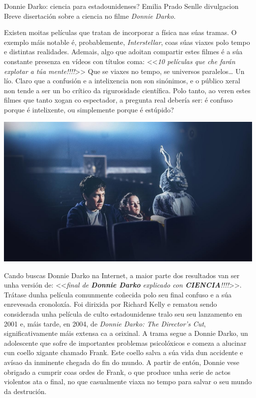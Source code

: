 \Titular%
{Donnie Darko: ciencia para estadounidenses?}%
{Emilia Prado Senlle}%
{divulgacion}%
{Breve disertación sobre a ciencia no filme \textit{Donnie Darko}.}%

\begin{refsection}
\begin{multicols}{2}


Existen moitas películas que tratan de incorporar a física nas súas tramas. O
exemplo máis notable é, probablemente, \textit{Interstellar}, coas súas viaxes
polo tempo e distintas realidades. Ademais, algo que adoitan compartir estes
filmes é a súa constante presenza en vídeos con títulos coma: <<\textit{10
películas que che farán explotar a túa mente!!!!}>> Que se viaxes no tempo, se
universos paralelos… Un lío. Claro que a confusión e a intelixencia non son
sinónimos, e o público xeral non tende a ser un bo crítico da rigurosidade
científica. Polo tanto, ao veren estes filmes que tanto xogan co espectador, a
pregunta real debería ser: é confuso porque é intelixente, ou simplemente
porque é estúpido?\\

\begin{centering}
    \includegraphics[width=1\linewidth]{revistas/002/imaxes/DONNIE-DARKO.jpg}
\end{centering}

Cando buscas Donnie Darko na Internet, a maior parte dos resultados van ser
unha versión de: <<\textit{final de \textbf{Donnie Darko} explicado con
\textbf{CIENCIA}!!!!}>>. Trátase dunha película comunmente coñecida polo seu
final confuso e a súa enrevesada cronoloxía. Foi dirixida por Richard Kelly e
rematou sendo considerada unha película de culto estadounidense tralo seu seu
lanzamento en 2001 e, máis tarde, en 2004, de \textit{Donnie Darko: The
Director’s Cut}, significativamente máis extensa ca a orixinal. A trama segue a
Donnie Darko, un adolescente que sofre de importantes problemas psicolóxicos e
comeza a alucinar cun coello xigante chamado Frank. Este coello salva a súa
vida dun accidente e avísao da inminente chegada do fin do mundo. A partir de
entón, Donnie vese obrigado a cumprir coas ordes de Frank, o que produce unha
serie de actos violentos ata o final, no que casualmente viaxa no tempo para
salvar o seu mundo da destrución.


\end{multicols}
\end{refsection}
